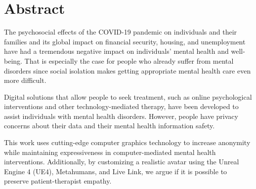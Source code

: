 \chapter*{Abstract}
\justify
The psychosocial effects of the COVID-19 pandemic on individuals and their families and its global impact on financial security, housing, and unemployment have had a tremendous negative impact on individuals’ mental health and well-being. That is especially the case for people who already suffer from mental disorders since social isolation makes getting appropriate mental health care even more difficult.

Digital solutions that allow people to seek treatment, such as online psychological interventions and other technology-mediated therapy, have been developed to assist individuals with mental health disorders. However, people have privacy concerns about their data and their mental health information safety. 

This work uses cutting-edge computer graphics technology to increase anonymity while maintaining expressiveness in computer-mediated mental health interventions. Additionally, by customizing a realistic avatar using the Unreal Engine 4 (UE4), Metahumans, and Live Link, we argue if it is possible to preserve patient-therapist empathy.

